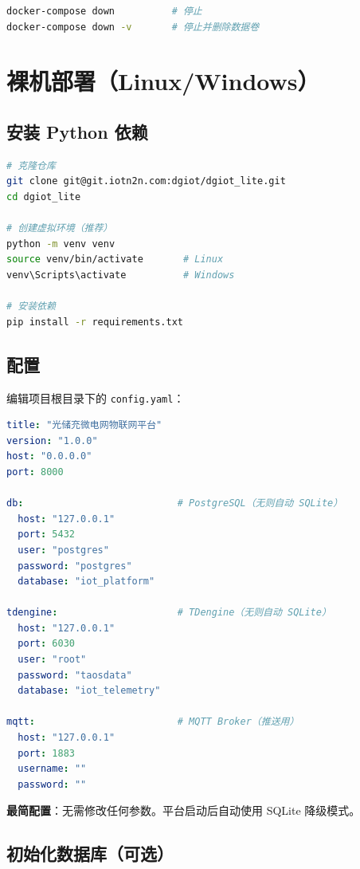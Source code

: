 \documentclass[12pt,a4paper]{ctexart}
\begin{document}
\begin{lstlisting}[language=bash]
docker-compose down          # 停止
docker-compose down -v       # 停止并删除数据卷
\end{lstlisting}

\section{裸机部署（Linux/Windows）}

\subsection{安装 Python 依赖}

\begin{lstlisting}[language=bash]
# 克隆仓库
git clone git@git.iotn2n.com:dgiot/dgiot_lite.git
cd dgiot_lite

# 创建虚拟环境（推荐）
python -m venv venv
source venv/bin/activate       # Linux
venv\Scripts\activate          # Windows

# 安装依赖
pip install -r requirements.txt
\end{lstlisting}

\subsection{配置}

编辑项目根目录下的 \texttt{config.yaml}：

\begin{lstlisting}[language=yaml]
title: "光储充微电网物联网平台"
version: "1.0.0"
host: "0.0.0.0"
port: 8000

db:                           # PostgreSQL（无则自动 SQLite）
  host: "127.0.0.1"
  port: 5432
  user: "postgres"
  password: "postgres"
  database: "iot_platform"

tdengine:                     # TDengine（无则自动 SQLite）
  host: "127.0.0.1"
  port: 6030
  user: "root"
  password: "taosdata"
  database: "iot_telemetry"

mqtt:                         # MQTT Broker（推送用）
  host: "127.0.0.1"
  port: 1883
  username: ""
  password: ""
\end{lstlisting}

\noindent\textbf{最简配置}：无需修改任何参数。平台启动后自动使用 SQLite 降级模式。

\subsection{初始化数据库（可选）}
\end{document}
